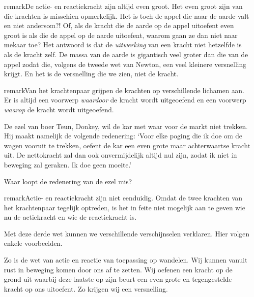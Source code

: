 \documentclass{ximera}
\begin{document}
\begin{expandable}{remark}{De actie- en reactiekracht zijn altijd even groot.}
	Het even groot zijn van die krachten is misschien opmerkelijk. Het is toch de appel die naar de aarde valt en niet andersom?! Of, als de kracht die de aarde op de appel uitoefent even groot is als die de appel op de aarde uitoefent, waarom gaan ze dan niet naar mekaar toe? Het antwoord is dat de \emph{uitwerking} van een kracht niet hetzelfde is als de kracht zelf. De massa van de aarde is gigantisch veel groter dan die van de appel zodat die, volgens de tweede wet van Newton, een veel kleinere versnelling krijgt. En het is de versnelling die we zien, niet de kracht.
\end{expandable}

\begin{expandable}{remark}{Van het krachtenpaar grijpen de krachten op verschillende lichamen aan.}
	Er is altijd een voorwerp \emph{waardoor} de kracht wordt uitgeoefend en een voorwerp \emph{waarop} de kracht wordt uitgeoefend.

	\begin{denkvraag*}{}%
		De ezel van boer Teun, Donkey, wil de kar met waar voor de markt niet trekken. Hij maakt namelijk de volgende redenering: `Voor elke poging die ik doe om de wagen vooruit te trekken, oefent de kar een even grote maar achterwaartse kracht uit. De nettokracht zal dan ook onvermijdelijk altijd nul zijn, zodat ik niet in beweging zal geraken. Ik doe geen moeite.'

		Waar loopt de redenering van de ezel mis?
	\end{denkvraag*}

\end{expandable}

\begin{expandable}{remark}{Actie- en reactiekracht zijn niet eenduidig.}
	Omdat de twee krachten van het krachtenpaar tegelijk optreden, is het in feite niet mogelijk aan te geven wie nu de actiekracht en wie de reactiekracht is.
\end{expandable}

Met deze derde wet kunnen we verschillende verschijnselen verklaren. Hier volgen enkele voorbeelden.

\begin{example} \nl
	Zo is de wet van actie en reactie van toepassing op wandelen. Wij kunnen vanuit rust in beweging komen door ons af te zetten. Wij oefenen een kracht op de grond uit waarbij deze laatste op zijn beurt een even grote en tegengestelde kracht op ons uitoefent. Zo krijgen wij een versnelling. 

\end{example}
\end{document}
